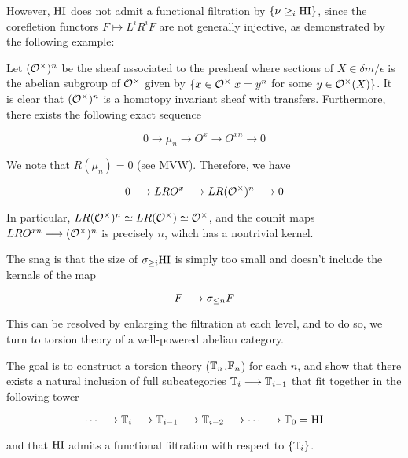 However, $\mathrm{HI}$ does not admit a functional filtration by $\{\nu 
\geq_{i} \mathrm{HI}\}$, since the corefletion functors $F \mapsto 
L^iR^iF$ are not generally injective, as demonstrated by the 
following example: 

\begin{ex}
Let $(\mathcal{O}^{\times})^n$ be the sheaf associated to the presheaf where 
sections of $X \in \delta m /\epsilon$ is the abelian subgroup of 
$\mathcal{O}^{\times}$ given by $\{x \in \mathcal{O}^{\times} | x=y^n$ for some $y \in \mathcal{O}^{\times}(X)\}$. 
It is clear that $(\mathcal{O}^{\times})^n$ is a homotopy invariant sheaf with 
transfers. Furthermore, there exists the following exact sequence 

\begin{equation}
0 \longrightarrow \mu_n \longrightarrow O^x \longrightarrow O^{xn} 
\longrightarrow 0
\end{equation}

We note that $R(\mu_n) = 0$ (see MVW). Therefore, we have

\begin{equation}
0 \longrightarrow LRO^x \longrightarrow LR(\mathcal{O}^{\times})^{n} \longrightarrow 0
\end{equation}

In particular, $LR(\mathcal{O}^{\times})^{n} \simeq LR(\mathcal{O}^{\times}) \simeq \mathcal{O}^{\times}$, and the counit 
maps $LRO^{xn} \longrightarrow (\mathcal{O}^{\times})^n$ is precisely $n$, wihch has 
a nontrivial kernel.

The snag is that the size of $\sigma_{\geq i} \mathrm{HI}$ is simply too small 
and doesn't include the kernals of the map

\begin{equation}
F \longrightarrow \sigma_{\leq n} F
\end{equation}

This can be resolved by enlarging the filtration at each level, 
and to do so, we turn to torsion theory of a well-powered abelian 
category.  
\end{ex}

The goal is to construct a torsion theory ($\mathbb{T}_n$,$\mathbb{F}_n$) 
for each $n$, and show that there exists a natural inclusion of 
full subcategories $\mathbb{T}_i \longrightarrow \mathbb{T}_{i-1}$ that fit 
together in the following tower

\begin{equation}
\cdots \longrightarrow \mathbb{T}_i \longrightarrow \mathbb{T}_{i-1} 
\longrightarrow \mathbb{T}_{i-2} \longrightarrow \cdots 
\longrightarrow \mathbb{T}_0 = \mathrm{HI}
\end{equation}

and that $\mathrm{HI}$ admits a functional filtration with respect to 
$\{\mathbb{T}_i\}$.

